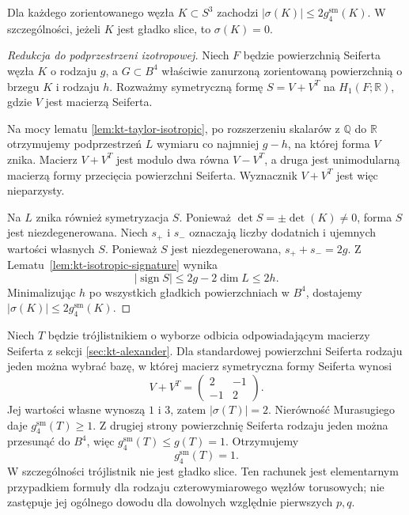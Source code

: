 \begin{twierdzenie}
Dla każdego zorientowanego węzła $K\subset S^3$
zachodzi $|\sigma(K)|\leq2g_4^{\mathrm{sm}}(K)$.
W szczególności, jeżeli $K$ jest gładko slice, to
$\sigma(K)=0$.
\end{twierdzenie}

\begin{proof}[Redukcja do podprzestrzeni izotropowej]
Niech $F$ będzie powierzchnią Seiferta węzła $K$ o
rodzaju $g$, a $G\subset B^4$ właściwie zanurzoną
zorientowaną powierzchnią o brzegu $K$ i rodzaju $h$.
Rozważmy symetryczną formę $S=V+V^T$ na
$H_1(F;\mathbb R)$, gdzie $V$ jest macierzą Seiferta.

Na mocy lematu \ref{lem:kt-taylor-isotropic},
po rozszerzeniu skalarów z $\mathbb Q$ do $\mathbb R$
otrzymujemy podprzestrzeń $L$ wymiaru co najmniej
$g-h$, na której forma $V$ znika.
Macierz $V+V^T$ jest modulo dwa równa $V-V^T$,
a druga jest unimodularną macierzą formy
przecięcia powierzchni Seiferta. Wyznacznik
$V+V^T$ jest więc nieparzysty.

Na $L$ znika również symetryzacja $S$. Ponieważ
$\det S=\pm\det(K)\ne0$, forma $S$ jest niezdegenerowana. Niech $s_+$ i $s_-$ oznaczają liczby dodatnich
i ujemnych wartości własnych $S$.
Ponieważ $S$ jest niezdegenerowana,
$s_++s_-=2g$. Z Lematu~\ref{lem:kt-isotropic-signature}
wynika
\[
|\operatorname{sign}S|
\le 2g-2\dim L\le2h.
\]
Minimalizując $h$ po wszystkich gładkich powierzchniach
w $B^4$, dostajemy $|\sigma(K)|\le2g_4^{\mathrm{sm}}(K)$.
\end{proof}

\begin{przyklad}
\label{ex:kt-trefoil-four-genus-signature}
Niech $T$ będzie trójlistnikiem o wyborze
odbicia odpowiadającym macierzy Seiferta
z sekcji \ref{sec:kt-alexander}.
Dla standardowej powierzchni Seiferta rodzaju jeden
można wybrać bazę, w której macierz symetryczna
formy Seiferta wynosi
\[
V+V^T=\begin{pmatrix}2&-1\\-1&2\end{pmatrix}.
\]
Jej wartości własne wynoszą $1$ i $3$,
zatem $|\sigma(T)|=2$.
Nierówność Murasugiego daje
$g_4^{\mathrm{sm}}(T)\ge1$.
Z drugiej strony powierzchnię Seiferta
rodzaju jeden można przesunąć do $B^4$,
więc $g_4^{\mathrm{sm}}(T)\le g(T)=1$.
Otrzymujemy
\[
g_4^{\mathrm{sm}}(T)=1.
\]
W szczególności trójlistnik nie jest
gładko slice. Ten rachunek jest
elementarnym przypadkiem formuły
dla rodzaju czterowymiarowego węzłów torusowych;
nie zastępuje jej ogólnego dowodu
dla dowolnych względnie pierwszych $p,q$.
\end{przyklad}

